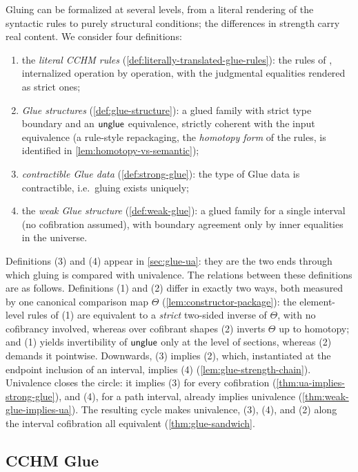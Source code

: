 Gluing can be formalized at several levels, from a literal rendering of the
syntactic rules to purely structural conditions; the differences in strength
carry real content. We consider four definitions:
\begin{enumerate}[noitemsep]
	\item the \emph{literal CCHM rules}
	(\cref{def:literally-translated-glue-rules}): the rules of
	\citet[Fig.~4]{CCHM2018}, internalized operation by operation, with the
	judgmental equalities rendered as strict ones;
	\item \emph{Glue structures} (\cref{def:glue-structure}): a glued family
	with strict type boundary and an $\mathsf{unglue}$ equivalence, strictly
	coherent with the input equivalence (a rule-style repackaging, the
	\emph{homotopy form} of the rules, is identified in
	\cref{lem:homotopy-vs-semantic});
	\item \emph{contractible Glue data} (\cref{def:strong-glue}): the type
	of Glue data is contractible, i.e.\ gluing exists uniquely;
	\item the \emph{weak Glue structure} (\cref{def:weak-glue}): a glued
	family for a single interval (no cofibration assumed), with boundary agreement only
	by inner equalities in the universe.
\end{enumerate}
Definitions (3) and (4) appear in \cref{sec:glue-ua}: they are the two ends
through which gluing is compared with univalence. The relations between
these definitions are as follows. Definitions (1) and (2) differ in exactly
two ways, both measured by one canonical comparison map $\Theta$
(\cref{lem:constructor-package}): the element-level rules of (1) are
equivalent to a \emph{strict} two-sided inverse of $\Theta$, with no
cofibrancy involved, whereas over cofibrant shapes (2) inverts $\Theta$ up
to homotopy; and (1) yields invertibility of $\mathsf{unglue}$ only at the level of
sections, whereas (2) demands it pointwise. Downwards, (3) implies (2), which,
instantiated at the endpoint inclusion of an interval, implies (4)
(\cref{lem:glue-strength-chain}). Univalence closes the circle: it implies
(3) for every cofibration (\cref{thm:ua-implies-strong-glue}), and (4),
for a path interval, already implies univalence
(\cref{thm:weak-glue-implies-ua}). The resulting cycle makes univalence,
(3), (4), and (2) along the interval cofibration
all equivalent (\cref{thm:glue-sandwich}.

\subsection{CCHM Glue}


